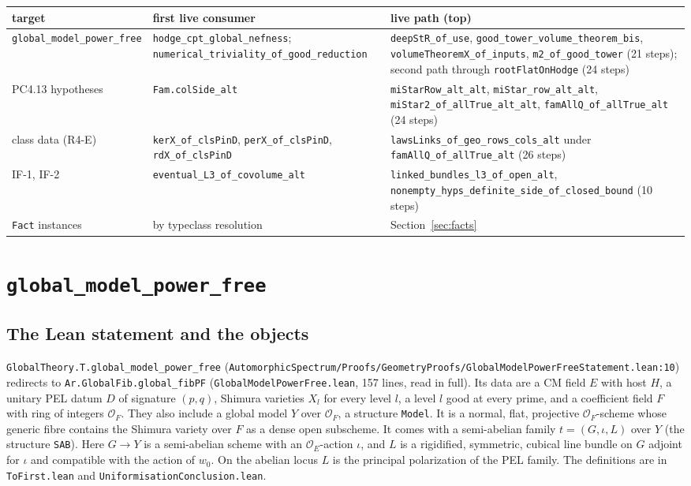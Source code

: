 \documentclass[11pt]{article}
\newcommand{\lean}[1]{\nolinkurl{#1}}
\newcommand{\Lpath}[1]{\nolinkurl{#1}}
\theoremstyle{remark}
\begin{document}
\begin{center}\small
\begin{tabularx}{\textwidth}{>{\raggedright}p{3.6cm}>{\raggedright}p{4.3cm}>{\raggedright\arraybackslash}X}
\toprule
target & first live consumer & live path (top) \\
\midrule
\lean{global_model_power_free} & \lean{hodge_cpt_global_nefness}; \lean{numerical_triviality_of_good_reduction} & \lean{deepStR_of_use}, \lean{good_tower_volume_theorem_bis}, \lean{volumeTheoremX_of_inputs}, \lean{m2_of_good_tower} (21 steps); second path through \lean{rootFlatOnHodge} (24 steps)\\
PC4.13 hypotheses & \lean{Fam.colSide_alt} & \lean{miStarRow_alt_alt}, \lean{miStar_row_alt_alt}, \lean{miStar2_of_allTrue_alt_alt}, \lean{famAllQ_of_allTrue_alt} (24 steps)\\
class data (R4-E) & \lean{kerX_of_clsPinD}, \lean{perX_of_clsPinD}, \lean{rdX_of_clsPinD} & \lean{lawsLinks_of_geo_rows_cols_alt} under \lean{famAllQ_of_allTrue_alt} (26 steps)\\
IF-1, IF-2 & \lean{eventual_L3_of_covolume_alt} & \lean{linked_bundles_l3_of_open_alt}, \lean{nonempty_hyps_definite_side_of_closed_bound} (10 steps)\\
\lean{Fact} instances & by typeclass resolution & Section~\ref{sec:facts}\\
\bottomrule
\end{tabularx}
\end{center}

\section{\texorpdfstring{\lean{global_model_power_free}}{global\_model\_power\_free}}\label{sec:A}

\subsection{The Lean statement and the objects}

\lean{GlobalTheory.T.global_model_power_free} (\Lpath{AutomorphicSpectrum/Proofs/GeometryProofs/GlobalModelPowerFreeStatement.lean:10}) redirects to \lean{Ar.GlobalFib.global_fibPF} (\Lpath{GlobalModelPowerFree.lean}, 157 lines, read in full). Its data are a CM field $E$ with host $H$, a unitary PEL datum $D$ of signature $(p,q)$, Shimura varieties $X_l$ for every level $l$, a level $l$ good at every prime, and a coefficient field $F$ with ring of integers $\mathcal O_F$. They also include a global model $Y$ over $\mathcal O_F$, a structure \lean{Model}. It is a normal, flat, projective $\mathcal O_F$-scheme whose generic fibre contains the Shimura variety over $F$ as a dense open subscheme. It comes with a semi-abelian family $t=(G,\iota,L)$ over $Y$ (the structure \lean{SAB}). Here $G\to Y$ is a semi-abelian scheme with an $\mathcal O_E$-action $\iota$, and $L$ is a rigidified, symmetric, cubical line bundle on $G$ adjoint for $\iota$ and compatible with the action of $w_0$. On the abelian locus $L$ is the principal polarization of the PEL family. The definitions are in \Lpath{ToFirst.lean} and \Lpath{UniformisationConclusion.lean}.
\end{document}
